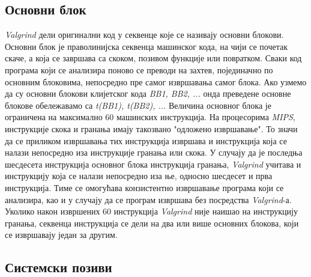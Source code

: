\documentclass[12pt,oneside]{memoir}
\begin{document}
\subsection{Основни блок}

\indent \textit{Valgrind} дели оригинални код у секвенце које се називају основни блокови. Основни блок је праволинијска секвенца машинског кода, на чији се почетак скаче, а која се завршава са скоком, позивом функције или повратком. Сваки код програма који се анализира поново се преводи на захтев, појединачно по основним блоковима, непосредно пре самог извршавања самог блока. Ако узмемо да су основни блокови клијетског кода \textit{BB1, BB2, ...} онда преведене основне блокове обележавамо са \textit{t(BB1), t(BB2), ...} Величина основног блока је ограничена на максимално 60 машинских инструкција. На процесорима \textit{MIPS}, инструкције скока и гранања имају такозвано "одложено извршавање". То значи да се приликом извршавања тих инструкција извршава и инструкција која се налази непосредно иза инструкције гранања или скока. У случају да је последња шесдесета инструкција основног блока инструкција гранања, \textit{Valgrind} учитава и инструкцију која се налази непосредно иза ње, односно шесдесет и прва инструкција. Тиме се омогућава конзистентно извршавање програма који се анализира, као и у случају да се програм извршава без посредства \textit{Valgrind}-а. Уколико након извршених 60 инструкција \textit{Valgrind} није наишао на инструкцију гранања, секвенца инструкција се дели на два или више основних блокова, који се извршавају један за другим.



\subsection{Системски позиви}
\end{document}
